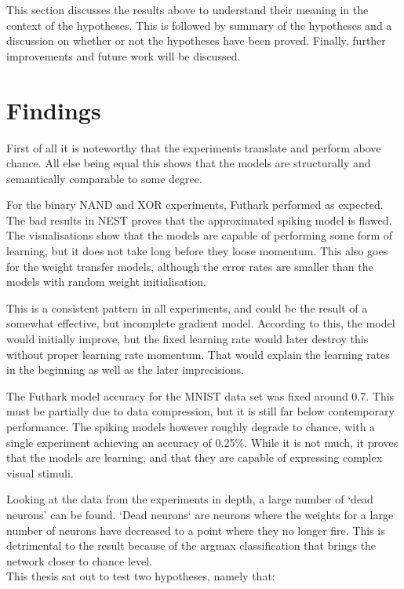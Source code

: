 \documentclass[report.tex]{subfiles}
\begin{document}
This section discusses the results above to understand their meaning in the
context of the hypotheses.
This is followed by summary of the hypotheses and a discussion on whether or not
the hypotheses have been proved.
Finally, further improvements and future work will be discussed.

\section{Findings}
First of all it is noteworthy that the experiments translate and perform above
chance. 
All else being equal this shows that the models are structurally and
semantically comparable to some degree.

For the binary NAND and XOR experiments, Futhark performed as expected.
The bad results in NEST proves that the approximated spiking model is flawed.
The visualisations show that the models are capable of performing some form of
learning, but it does not take long before they loose momentum. 
This also goes for the weight transfer models, although the error rates are
smaller than the models with random weight initialisation.

This is a consistent pattern in all experiments, and could be the 
result of a somewhat effective, but incomplete gradient model.
According to this, the model would initially improve, but 
the fixed learning rate would later destroy this without proper learning
rate momentum.
That would explain the learning rates in the beginning as well as the later
imprecisions.

The Futhark model accuracy for the MNIST data set was fixed around 0.7.
This must be partially due to data compression, but it is still far below 
contemporary performance.
The spiking models however roughly degrade to chance, with a single experiment
achieving an accuracy of 0.25\%.
While it is not much, it proves that the models are learning, and that they are
capable of expressing complex visual stimuli.

Looking at the data from the experiments in depth, a large number of 
`dead neurons' can be found.
`Dead neurons` are neurons where the weights for a large number of
neurons have decreased to a point where they no longer fire.
This is detrimental to the result because of the argmax classification that
brings the network closer to chance level.
\\[0.1cm]

This thesis sat out to test two hypotheses, namely that:
\end{document}
